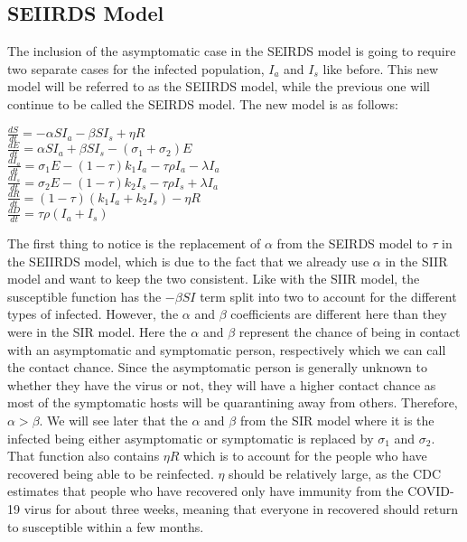 \documentclass[12pt]{article} %
\begin{document}
\subsection{SEIIRDS Model}
The inclusion of the asymptomatic case in the SEIRDS model is going to require two separate cases for the infected population, $I_a$ and $I_s$ like before. This new model will be referred to as the SEIIRDS model, while the previous one will continue to be called the SEIRDS model. The new model is as follows:
\begin{center}
$\frac{dS}{dt} = -\alpha SI_a -\beta SI_s + \eta R$\\
$\frac{dE}{dt} = \alpha SI_a + \beta SI_s - (\sigma_1 + \sigma_2) E$\\
$\frac{dI_a}{dt} = \sigma_1 E - (1-\tau)k_1 I_a-\tau \rho I_a - \lambda I_a$\\
$\frac{dI_s}{dt} = \sigma_2 E - (1-\tau)k _2I_s-\tau \rho I_s + \lambda I_a$\\
$\frac{dR}{dt} = (1-\tau)(k_1I_a + k_2 I_s) - \eta R$\\
$\frac{dD}{dt} = \tau \rho (I_a + I_s)$
\end{center}

The first thing to notice is the replacement of $\alpha$ from the SEIRDS model to $\tau$ in the SEIIRDS model, which is due to the fact that we already use $\alpha$ in the SIIR model and want to keep the two consistent. Like with the SIIR model, the susceptible function has the $-\beta SI$ term split into two to account for the different types of infected. However, the $\alpha$ and $\beta$ coefficients are different here than they were in the SIR model. Here the $\alpha$ and $\beta$ represent the chance of being in contact with an asymptomatic and symptomatic person, respectively which we can call the contact chance. Since the asymptomatic person is generally unknown to whether they have the virus or not, they will have a higher contact chance as most of the symptomatic hosts will be quarantining away from others. Therefore, $\alpha > \beta$. We will see later that the $\alpha$ and $\beta$ from the SIR model where it is the infected being either asymptomatic or symptomatic is replaced by $\sigma_1$ and $\sigma_2$. That function also contains $\eta R$ which is to account for the people who have recovered being able to be reinfected. $\eta$ should be relatively large, as the CDC estimates that people who have recovered only have immunity from the COVID-19 virus for about three weeks, meaning that everyone in recovered should return to susceptible within a few months.
\end{document}
